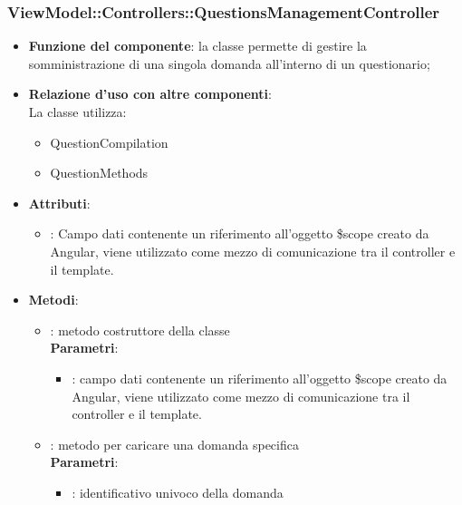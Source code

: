 \subsubsection{ViewModel::Controllers::QuestionsManagementController}
\begin{itemize}
\item\textbf{Funzione del componente}: la classe permette di gestire la somministrazione di una singola domanda all'interno di un questionario;
	\item\textbf{Relazione d'uso con altre componenti}: \\
La classe utilizza:
	\begin{itemize}
		\item QuestionCompilation
		\item QuestionMethods
	\end{itemize}
\item\textbf{Attributi}:
	\begin{itemize}
		\item{}: Campo dati contenente un riferimento all’oggetto \$scope creato da Angular, viene utilizzato come mezzo di comunicazione tra il controller e il template.\\
	\end{itemize}
\item\textbf{Metodi}:
	\begin{itemize}
		\item{}: metodo costruttore della classe\\
		\textbf{Parametri}:
			\begin{itemize}
				\item{}: campo dati contenente un riferimento all’oggetto \$scope creato da Angular, viene utilizzato come mezzo di comunicazione tra il controller e il template.\\
			\end{itemize}
		\item{}: metodo per caricare una domanda specifica\\
		\textbf{Parametri}:
			\begin{itemize}
				\item{}: identificativo univoco della domanda\\
			\end{itemize}
	\end{itemize}
\end{itemize}

